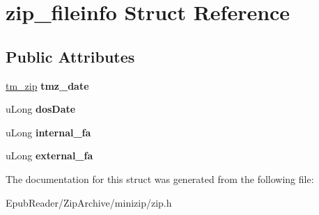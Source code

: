 \hypertarget{structzip__fileinfo}{\section{zip\-\_\-fileinfo Struct Reference}
\label{structzip__fileinfo}
}
\subsection*{Public Attributes}
\begin{DoxyCompactItemize}
\item 
\hypertarget{structzip__fileinfo_ae09a694a598b7507d23705764c9e46fb}{\hyperlink{structtm__zip__s}{tm\-\_\-zip} {\bfseries tmz\-\_\-date}}\label{structzip__fileinfo_ae09a694a598b7507d23705764c9e46fb}

\item 
\hypertarget{structzip__fileinfo_a0541c57e59450fbc17b2f898ca4bc9e8}{u\-Long {\bfseries dos\-Date}}\label{structzip__fileinfo_a0541c57e59450fbc17b2f898ca4bc9e8}

\item 
\hypertarget{structzip__fileinfo_a396175a434b86115ce5600ab1dbb1644}{u\-Long {\bfseries internal\-\_\-fa}}\label{structzip__fileinfo_a396175a434b86115ce5600ab1dbb1644}

\item 
\hypertarget{structzip__fileinfo_ac0be78ded330ffd46815bafc5b6b37bb}{u\-Long {\bfseries external\-\_\-fa}}\label{structzip__fileinfo_ac0be78ded330ffd46815bafc5b6b37bb}

\end{DoxyCompactItemize}


The documentation for this struct was generated from the following file\-:\begin{DoxyCompactItemize}
\item 
Epub\-Reader/\-Zip\-Archive/minizip/zip.\-h\end{DoxyCompactItemize}
